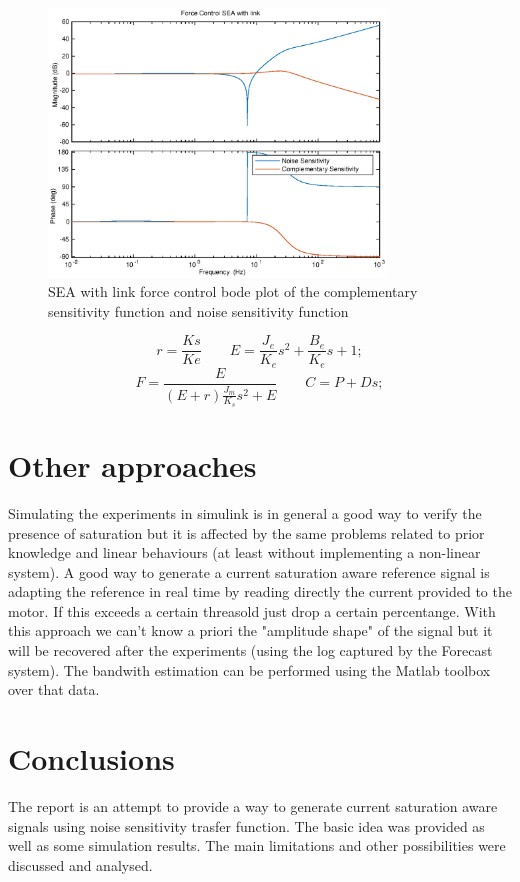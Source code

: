 \documentclass[a4paper,11pt]{article}
\begin{document}
\begin{figure}[H]
\begin{center}
\includegraphics[width=0.8\textwidth]{images/sea_tf.eps}
\end{center}
\caption{SEA with link force control bode plot of the complementary sensitivity function and noise sensitivity function}
\label{fig:sea_tf}
\end{figure}

\[
  r = \frac{Ks}{Ke} \qquad
  E = \frac{J_e}{K_e}s^2 + \frac{B_e}{K_e}s + 1;
\]\[
  F = \frac{E}{(E + r)\frac{J_m}{K_s}s^2 + E} \qquad
  C = P + Ds;    
\]

\section{Other approaches}

Simulating the experiments in simulink is in general a good way to verify the presence of saturation but it is affected by the same problems related to prior knowledge and linear behaviours (at least without implementing a non-linear system). A good way to generate a current saturation aware reference signal is adapting the reference in real time by reading directly the current provided to the motor. If this exceeds a certain threasold just drop a certain percentange. With this approach we can't know a priori the "amplitude shape" of the signal but it will be recovered after the experiments (using the log captured by the Forecast system). The bandwith estimation can be performed using the Matlab toolbox over that data.

\section{Conclusions}
The report is an attempt to provide a way to generate current saturation aware signals using noise sensitivity trasfer function. The basic idea was provided as well as some simulation results. The main limitations and other possibilities were discussed and analysed.
\end{document}
